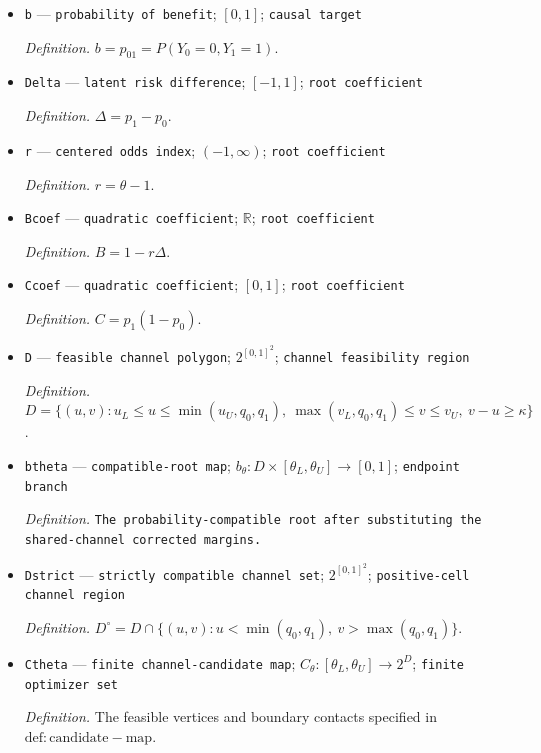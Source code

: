 \documentclass{article}
\begin{document}
\begin{itemize}
  \item \texttt{b} --- \texttt{probability of benefit}; \([0,1]\); \texttt{causal target}
  \par\smallskip\noindent\emph{Definition.} \(b=p_{01}=P(Y_0=0,Y_1=1)\).
  \item \texttt{Delta} --- \texttt{latent risk difference}; \([-1,1]\); \texttt{root coefficient}
  \par\smallskip\noindent\emph{Definition.} \(\Delta=p_1-p_0\).
  \item \texttt{r} --- \texttt{centered odds index}; \((-1,\infty)\); \texttt{root coefficient}
  \par\smallskip\noindent\emph{Definition.} \(r=\theta-1\).
  \item \texttt{Bcoef} --- \texttt{quadratic coefficient}; \(\mathbb R\); \texttt{root coefficient}
  \par\smallskip\noindent\emph{Definition.} \(B=1-r\Delta\).
  \item \texttt{Ccoef} --- \texttt{quadratic coefficient}; \([0,1]\); \texttt{root coefficient}
  \par\smallskip\noindent\emph{Definition.} \(C=p_1(1-p_0)\).
  \item \texttt{D} --- \texttt{feasible channel polygon}; \(2^{[0,1]^2}\); \texttt{channel feasibility region}
  \par\smallskip\noindent\emph{Definition.} \(D=\{(u,v):u_L\le u\le\min(u_U,q_0,q_1),\ \max(v_L,q_0,q_1)\le v\le v_U,\ v-u\ge\kappa\}\).
  \item \texttt{btheta} --- \texttt{compatible-\allowbreak{}root map}; \(b_{\theta}:D\times[\theta_L,\theta_U]\to[0,1]\); \texttt{endpoint branch}
  \par\smallskip\noindent\emph{Definition.} \texttt{The probability-\allowbreak{}compatible root after substituting the shared-\allowbreak{}channel corrected margins.}
  \item \texttt{Dstrict} --- \texttt{strictly compatible channel set}; \(2^{[0,1]^2}\); \texttt{positive-\allowbreak{}cell channel region}
  \par\smallskip\noindent\emph{Definition.} \(D^{\circ}=D\cap\{(u,v):u<\min(q_0,q_1),\ v>\max(q_0,q_1)\}\).
  \item \texttt{Ctheta} --- \texttt{finite channel-\allowbreak{}candidate map}; \(C_{\theta}: [\theta_L,\theta_U]\to 2^D\); \texttt{finite optimizer set}
  \par\smallskip\noindent\emph{Definition.} The feasible vertices and boundary contacts specified in \(\mathrm{def:candidate-map}\).

\end{itemize}
\end{document}
